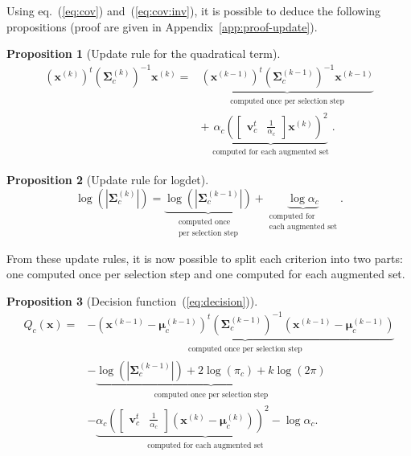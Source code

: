 \documentclass[journal,10pt]{IEEEtran}
\newtheorem{prop}{Proposition}
\begin{document}
        Using eq.~(\ref{eq:cov}) and~(\ref{eq:cov:inv}), it is possible to
        deduce  the   following  propositions  (proof  are   given  in
        Appendix~\ref{app:proof-update}).
        \begin{prop}[Update rule for the quadratical term]
        \label{eq:update-quad}
            \begin{align}
              (\mathbf{x}^{(k)})^t (\boldsymbol{\Sigma}^{(k)}_c)^{-1} \mathbf{x}^{(k)} = &\underbrace{(\mathbf{x}^{(k-1)})^t (\boldsymbol{\Sigma}^{(k-1)}_c)^{-1} \mathbf{x}^{(k-1)}}_{\substack{\text{computed once per selection step}}} \nonumber \\
                                                                                       &+ \underbrace{\alpha_c ( \left[\begin{array}{cc} \mathbf{v}_c^t & \frac{1}{\alpha_c} \end{array}\right] \mathbf{x}^{(k)} )^2}_{\substack{\text{computed for each augmented set}}}.
            \end{align}
        \end{prop}
        \begin{prop}[Update rule for logdet]
        \label{eq:update-log}
            \begin{equation}
                \log \left(|\boldsymbol{\Sigma}^{(k)}_c|\right) = \underbrace{\log \left(|\boldsymbol{\Sigma}^{(k-1)}_c|\right)}_{\substack{\text{computed once}\\ \text{per selection step}}} + \underbrace{\log \alpha_c}_{\substack{\text{computed for} \\ \text{each augmented set}}}.
            \end{equation}
        \end{prop}

        From these update rules, it is now possible to split each criterion into two parts: one computed once per selection step and one computed for each augmented set.

        \begin{prop}[Decision function~(\ref{eq:decision})]
            \begin{align}
            \label{eq:q-update}
                Q_c(\mathbf{x}) = &- \underbrace{(\mathbf{x}^{(k-1)} - \boldsymbol{\mu}_c^{(k-1)})^t (\boldsymbol{\Sigma}^{(k-1)}_c)^{-1} (\mathbf{x}^{(k-1)} - \boldsymbol{\mu}^{(k-1)}_c)}_{\substack{\text{computed once per selection step}}} \nonumber \\
                &- \underbrace{\log \left(|\boldsymbol{\Sigma}^{(k-1)}_c|\right) + 2 \log (\pi_c) + k \log(2 \pi)}_{\substack{\text{computed once per selection step}}} \nonumber \\
                &- \underbrace{\alpha_c \left( \left[\begin{array}{cc} \mathbf{v}_c^t & \frac{1}{\alpha_c} \end{array}\right] (\mathbf{x}^{(k)} - \boldsymbol{\mu}_c^{(k)}) \right)^2 - \log \alpha_c}_{\substack{\text{computed for each augmented set}}}.
            \end{align}
        \end{prop}
\end{document}
